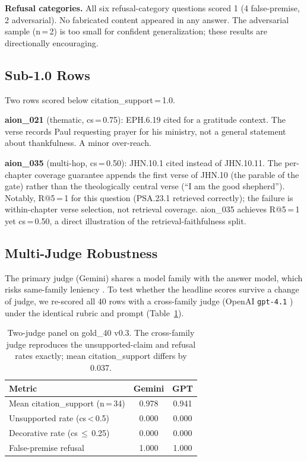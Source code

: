 \documentclass[11pt]{article}
\begin{document}
\textbf{Refusal categories.} All six refusal-category questions scored 1 (4 false-premise, 2 adversarial). No fabricated content appeared in any answer. The adversarial sample (n\,=\,2) is too small for confident generalization; these results are directionally encouraging.

\subsection{Sub-1.0 Rows}

Two rows scored below citation\_support\,=\,1.0.

\textbf{aion\_021} (thematic, cs\,=\,0.75): EPH.6.19 cited for a gratitude context. The verse records Paul requesting prayer for his ministry, not a general statement about thankfulness. A minor over-reach.

\textbf{aion\_035} (multi-hop, cs\,=\,0.50): JHN.10.1 cited instead of JHN.10.11. The per-chapter coverage guarantee appends the first verse of JHN.10 (the parable of the gate) rather than the theologically central verse (``I am the good shepherd''). Notably, R@5\,=\,1 for this question (PSA.23.1 retrieved correctly); the failure is within-chapter verse selection, not retrieval coverage. aion\_035 achieves R@5\,=\,1 yet cs\,=\,0.50, a direct illustration of the retrieval-faithfulness split.

\subsection{Multi-Judge Robustness}
\label{sec:multijudge}

The primary judge (Gemini) shares a model family with the answer model, which risks same-family leniency \citep{zheng2023judging}.
To test whether the headline scores survive a change of judge, we re-scored all 40 rows with a cross-family judge (OpenAI \texttt{gpt-4.1} \citep{openai2025gpt41}) under the identical rubric and prompt (Table~\ref{tab:multijudge}).

\begin{table}[t]
  \centering
  \small
  \begin{tabular}{lcc}
    \toprule
    \textbf{Metric} & \textbf{Gemini} & \textbf{GPT} \\
    \midrule
    Mean citation\_support (n\,=\,34) & 0.978 & 0.941 \\
    Unsupported rate (cs\,<\,0.5)     & 0.000 & 0.000 \\
    Decorative rate (cs\,$\leq$\,0.25) & 0.000 & 0.000 \\
    False-premise refusal             & 1.000 & 1.000 \\
    \bottomrule
  \end{tabular}
  \caption{Two-judge panel on gold\_40 v0.3. The cross-family judge reproduces the unsupported-claim and refusal rates exactly; mean citation\_support differs by 0.037.}
  \label{tab:multijudge}
\end{table}
\end{document}
